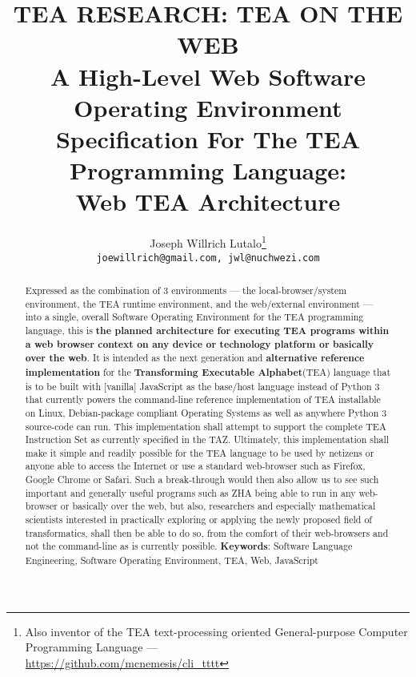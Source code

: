 \documentclass[a4paper, 18pt]{article} %
\title{TEA RESEARCH: \textbf{TEA ON THE WEB} \\[0.5ex] \small A High-Level Web Software Operating Environment Specification 
For The TEA Programming Language:\\ Web TEA Architecture
}
\author{Joseph Willrich Lutalo\thanks{Also inventor of the TEA text-processing oriented General-purpose Computer Programming Language ---\\ \url{https://github.com/mcnemesis/cli_tttt}}\\
\texttt{joewillrich@gmail.com, jwl@nuchwezi.com}}
\begin{document}
\maketitle


\Large

\begin{abstract}
\large

Expressed as the combination of 3 environments --- the local-browser/system environment, the TEA runtime environment, and the web/external environment --- into a single, overall Software Operating Environment\cite{lutalo2020dnap} for the TEA programming language, this is \textbf{the planned architecture for executing TEA programs within a web browser context on any device or technology platform or basically over the web}. It is intended as the next generation and \textbf{alternative reference implementation} for the \textbf{Transforming Executable Alphabet}(TEA) language that is to be built with [vanilla] JavaScript as the base/host language instead of Python 3 that currently powers the command-line reference implementation of TEA\cite{lutalo2024software}\cite{teaproject} installable on Linux, Debian-package compliant Operating Systems as well as anywhere Python 3 source-code can run. This implementation shall attempt to support the complete TEA Instruction Set as currently specified in the TAZ\cite{Lutalo2024TEATAZ}. Ultimately, this implementation shall make it simple and readily possible for the TEA language to be used by netizens or anyone able to access the Internet or use a standard web-browser such as Firefox, Google Chrome or Safari. Such a break-through would then also allow us to see such important and generally useful programs such as ZHA\cite{jwlzha} being able to run in any web-browser or basically over the web, but also, researchers and especially mathematical scientists interested in practically exploring or applying the newly proposed field of transformatics\cite{lutalo2025sequence}, shall then be able to do so, from the comfort of their web-browsers and not the command-line as is currently possible.
     \newline\newline
     \textbf{Keywords}: Software Language Engineering, Software Operating Environment, TEA, Web, JavaScript
\end{abstract}






\end{document}
